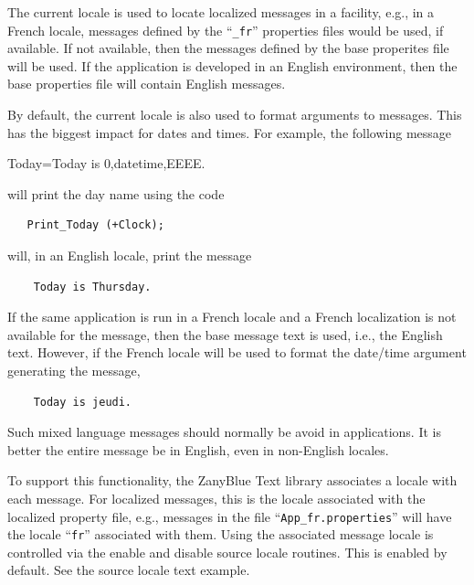 The current locale is used to locate localized messages in a facility,
e.g., in a French locale, messages defined by the ``\texttt{\_fr}''
properties files would be used, if available.  If not available,
then the messages defined by the base properites file will be used.
If the application is developed in an English environment, then the base
properties file will contain English messages.

By default, the current locale is also used to format arguments to messages.
This has the biggest impact for dates and times.  For example, the following
message
\begin{small}
\begin{tt}
    Today=Today is {0,datetime,EEEE}.
\end{tt}
\end{small}
will print the day name using the code
\begin{small}
\begin{verbatim}
   Print_Today (+Clock);
\end{verbatim}
\end{small}
will, in an English locale, print the message
\begin{small}
\begin{verbatim}
    Today is Thursday.
\end{verbatim}
\end{small}

If the same application is run in a French locale and a French localization
is not available for the message, then the base message text is used, i.e.,
the English text.  However, if the French locale will be used to format the
date/time argument generating the message,
\begin{small}
\begin{verbatim}
    Today is jeudi.
\end{verbatim}
\end{small}

Such mixed language messages should normally be avoid in applications.  It
is better the entire message be in English, even in non-English locales.

To support this functionality, the ZanyBlue Text library associates a locale
with each message.  For localized messages, this is the locale associated with
the localized property file, e.g., messages in the file
``\texttt{App\_fr.properties}'' will have the locale ``\texttt{fr}'' associated
with them.  Using the associated message locale is controlled via the enable
and disable source locale routines.  This is enabled by default.  See the
source locale text example.

